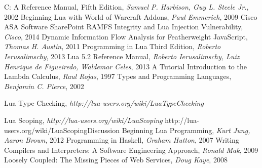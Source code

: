 \begin{thebibliography}{10}

 C: A Reference Manual, Fifth Edition, {\it  Samuel P. Harbison, Guy L. Steele Jr.}, 2002
 Beginning Lua with World of Warcraft Addons, {\it Paul Emmerich}, 2009
 Cisco ASA Software SharePoint RAMFS Integrity and Lua Injection Vulnerability, {\it Cisco}, 2014
 Dynamic Information Flow Analysis for Featherweight JavaScript, {\it Thomas H. Austin}, 2011
 Programming in Lua Third Edition, {\it  Roberto Ierusalimschy}, 2013
 Lua 5.2 Reference Manual, {\it Roberto Ierusalimschy, Luiz Henrique de Figueiredo, Waldemar Celes}, 2013
 A Tutorial Introduction to the Lambda Calculus, {\it Raul Rojas}, 1997
 Types and Programming Languages, {\it Benjamin C. Pierce}, 2002

 Lua Type Checking, {\it http://lua-users.org/wiki/LuaTypeChecking}

 Lua Scoping, {\it http://lua-users.org/wiki/LuaScoping}
 http://lua-users.org/wiki/LuaScopingDiscussion
 Beginning Lua Programming, {\it Kurt Jung, Aaron Brown}, 2012
 Programming in Haskell, {\it Graham Hutton}, 2007
 Writing Compilers and Interpreters: A Software Engineering Approach, {\it Ronald Mak}, 2009
 Loosely Coupled: The Missing Pieces of Web Services, {\it Doug Kaye}, 2008
\\

\end{thebibliography}
